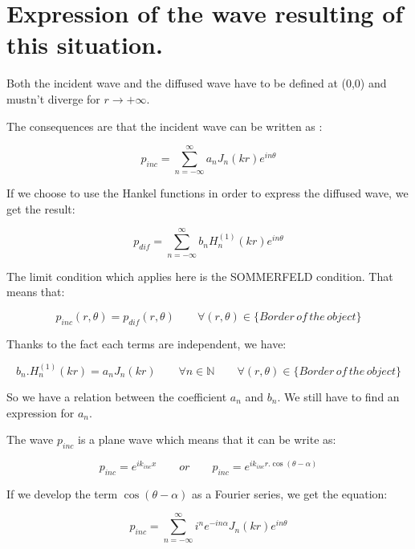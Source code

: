\chapter{Expression of the wave resulting of this situation.}

Both the incident wave and the diffused wave have to be defined at (0,0) and mustn't diverge for $r\rightarrow +\infty$.

The consequences are that the incident wave can be written as :

\begin{equation}
p_{inc} =  	\sum_{n=-\infty}^{\infty} a_n J_{n}(kr)e^{in\theta} 
\end{equation}

If we choose to use the Hankel functions in order to express the diffused wave, we get the result:

\begin{equation}
p_{dif} =  	\sum_{n=-\infty}^{\infty} b_{n}H^{(1)}_{n}(kr)e^{in\theta}
\end{equation}

The limit condition which applies here is the SOMMERFELD condition. That means that:

\begin{equation}
p_{inc}(r,\theta) = p_{dif}(r,\theta) \qquad \forall(r,\theta) \in \{Border\, of\, the\, object\}
\end{equation}

Thanks to the fact each terms are independent, we have:

\begin{equation}
b_{n}.H^{(1)}_{n}(kr) = a_n J_{n}(kr) \qquad \forall n \in \mathbb{N} \qquad \forall(r,\theta) \in \{Border\, of\, the\, object\}
\end{equation}

So we have a relation between the coefficient $a_n$ and $b_n$. We still have to find an expression for $a_n$.

The wave $p_{inc}$ is a plane wave which means that it can be write as:

\begin{equation}
p_{inc} = e^{i k_{inc} x} \qquad or \qquad p_{inc} = e^{i k_{inc} r.\cos( \theta - \alpha )}
\end{equation}

If we develop the term $\cos(\theta-\alpha)$ as a Fourier series, we get the equation:

\begin{equation}
p_{inc} =  	\sum_{n=-\infty}^{\infty} i^n e^{-i n \alpha} J_{n}(kr)e^{in\theta} 
\end{equation}

